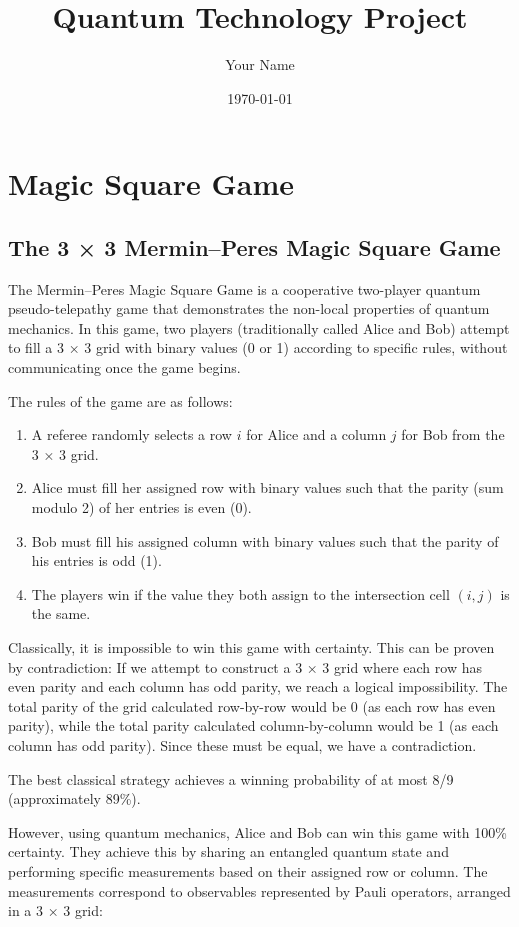 \documentclass[12pt,a4paper]{article}
\title{Quantum Technology Project}
\author{Your Name}
\date{\today}
\begin{document}
\maketitle

\section{Magic Square Game}

\subsection{The 3 × 3 Mermin–Peres Magic Square Game}

The Mermin–Peres Magic Square Game is a cooperative two-player quantum pseudo-telepathy game that demonstrates the non-local properties of quantum mechanics. In this game, two players (traditionally called Alice and Bob) attempt to fill a 3 × 3 grid with binary values (0 or 1) according to specific rules, without communicating once the game begins.

The rules of the game are as follows:

\begin{enumerate}
    \item A referee randomly selects a row $i$ for Alice and a column $j$ for Bob from the 3 × 3 grid.
    \item Alice must fill her assigned row with binary values such that the parity (sum modulo 2) of her entries is even (0).
    \item Bob must fill his assigned column with binary values such that the parity of his entries is odd (1).
    \item The players win if the value they both assign to the intersection cell $(i,j)$ is the same.
\end{enumerate}

Classically, it is impossible to win this game with certainty. This can be proven by contradiction: If we attempt to construct a 3 × 3 grid where each row has even parity and each column has odd parity, we reach a logical impossibility. The total parity of the grid calculated row-by-row would be 0 (as each row has even parity), while the total parity calculated column-by-column would be 1 (as each column has odd parity). Since these must be equal, we have a contradiction.

The best classical strategy achieves a winning probability of at most 8/9 (approximately 89\%).

However, using quantum mechanics, Alice and Bob can win this game with 100\% certainty. They achieve this by sharing an entangled quantum state and performing specific measurements based on their assigned row or column. The measurements correspond to observables represented by Pauli operators, arranged in a 3 × 3 grid:
\end{document}
